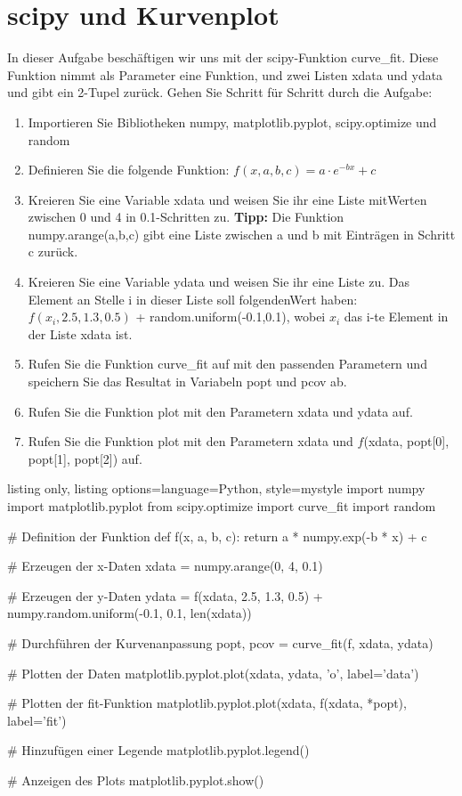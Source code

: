 \documentclass[11pt, oneside]{book}
\begin{document}
\section{scipy und Kurvenplot}
In dieser Aufgabe beschäftigen wir uns mit der scipy-Funktion curve\_fit. Diese Funktion nimmt als Parameter eine Funktion, und zwei Listen xdata und ydata und gibt ein 2-Tupel zurück. Gehen Sie Schritt für Schritt durch die Aufgabe:
\begin{enumerate}
    \item Importieren Sie Bibliotheken numpy, matplotlib.pyplot, scipy.optimize und random
    \item Definieren Sie die folgende Funktion: $f(x,a,b,c) = a \cdot e^{-bx} + c$
    \item Kreieren Sie eine Variable xdata und weisen Sie ihr eine Liste mitWerten zwischen 0 und 4 in 0.1-Schritten zu. \textbf{Tipp:} Die Funktion numpy.arange(a,b,c) gibt eine Liste zwischen a und b mit Einträgen in Schritt c zurück.
    \item Kreieren Sie eine Variable ydata und weisen Sie ihr eine Liste zu. Das Element an Stelle i in dieser Liste soll folgendenWert haben: $f (x_i ,2.5,1.3,0.5)$ + random.uniform(-0.1,0.1), wobei $x_i$ das i-te Element in der Liste xdata ist.
    \item Rufen Sie die Funktion curve\_fit auf mit den passenden Parametern und speichern Sie das Resultat in Variabeln popt und pcov ab.
    \item Rufen Sie die Funktion plot mit den Parametern xdata und ydata auf.
    \item Rufen Sie die Funktion plot mit den Parametern xdata und $f$(xdata, popt[0], popt[1], popt[2]) auf.
\end{enumerate}

\begin{tcblisting}{listing only, listing options={language=Python, style=mystyle}}
import numpy
import matplotlib.pyplot
from scipy.optimize import curve_fit
import random

# Definition der Funktion
def f(x, a, b, c):
    return a * numpy.exp(-b * x) + c

# Erzeugen der x-Daten
xdata = numpy.arange(0, 4, 0.1)

# Erzeugen der y-Daten
ydata = f(xdata, 2.5, 1.3, 0.5) + numpy.random.uniform(-0.1, 0.1, len(xdata))

# Durchführen der Kurvenanpassung
popt, pcov = curve_fit(f, xdata, ydata)

# Plotten der Daten
matplotlib.pyplot.plot(xdata, ydata, 'o', label='data')

# Plotten der fit-Funktion
matplotlib.pyplot.plot(xdata, f(xdata, *popt), label='fit')

# Hinzufügen einer Legende
matplotlib.pyplot.legend()

# Anzeigen des Plots
matplotlib.pyplot.show()

\end{tcblisting}
\end{document}
